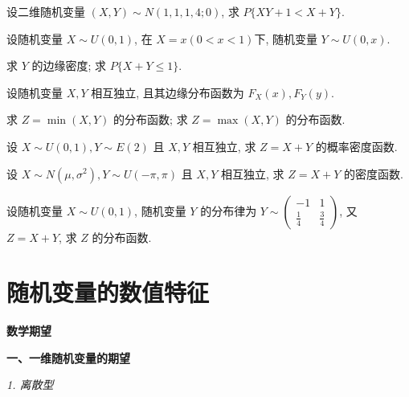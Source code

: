 \documentclass[padp]{ExBook}
\begin{document}
\begin{qitems}
    \begin{bbox}
        \qitem 设二维随机变量 $(X,Y) \sim N(1,1,1,4;0)$, 求 $P\{XY+1 < X+Y\}$.
    \end{bbox}

    \begin{bbox}
        \qitem 设随机变量 $X \sim U(0,1)$, 在 $X=x (0<x<1)$下, 随机变量 $Y \sim U(0,x)$.
        \begin{subqitems}
            \subqitem 求 $Y$ 的边缘密度;
            \subqitem 求 $P\{X+Y \le 1\}$.
        \end{subqitems}
    \end{bbox}
    
    \begin{bbox}
        \qitem 设随机变量 $X, Y$ 相互独立, 且其边缘分布函数为 $F_X(x), F_Y(y)$.
        \begin{subqitems}
            \subqitem 求 $Z=\min(X,Y)$ 的分布函数;
            \subqitem 求 $Z=\max(X,Y)$ 的分布函数.
        \end{subqitems}
    \end{bbox}

    \begin{bbox}
        \qitem 设 $X \sim U(0,1), Y \sim E(2)$ 且 $X, Y$ 相互独立, 求 $Z=X+Y$ 的概率密度函数.
    \end{bbox}
    
    \begin{bbox}
        \qitem 设 $X \sim N(\mu, \sigma^2), Y \sim U(-\pi, \pi)$ 且 $X, Y$ 相互独立, 求 $Z=X+Y$ 的密度函数.
    \end{bbox}
    \begin{bbox}
        \qitem 设随机变量 $X \sim U(0,1)$, 随机变量 $Y$ 的分布律为 $Y \sim \begin{pmatrix} -1 & 1 \\ \frac{1}{4} & \frac{3}{4} \end{pmatrix}$, 又 $Z=X+Y$, 求 $Z$ 的分布函数.
    \end{bbox}
\end{qitems}
\section{随机变量的数值特征}
\textbf{数学期望}
\vspace{1em}

\textbf{一、一维随机变量的期望}
\vspace{0.5em}

\textit{1. 离散型}
\vspace{0.5em}
\end{document}
